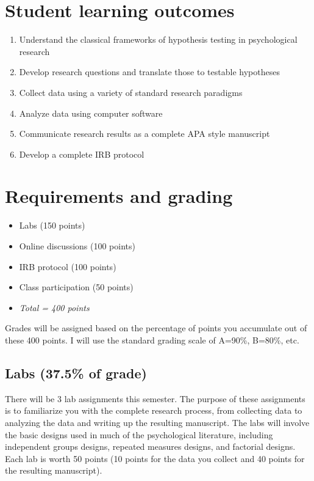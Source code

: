 \documentclass[10pt]{article}
\begin{document}
\section*{Student learning outcomes}
\label{sec-4}

\begin{enumerate}
\item Understand the classical frameworks of hypothesis testing in psychological research
\item Develop research questions and translate those to testable hypotheses
\item Collect data using a variety of standard research paradigms
\item Analyze data using computer software
\item Communicate research results as a complete APA style manuscript
\item Develop a complete IRB protocol
\end{enumerate}

\section*{Requirements and grading}
\label{sec-5}
\begin{itemize}
\item Labs (150 points)
\item Online discussions (100 points)
\item IRB protocol (100 points)
\item Class participation (50 points)
\item \emph{Total = 400 points}
\end{itemize}

Grades will be assigned based on the percentage of points you accumulate 
out of these 400 points.  I will use the standard grading scale of A=90\%, 
B=80\%, etc.

\subsection*{Labs (37.5\% of grade)}
\label{sec-5-1}
There will be 3 lab assignments this semester.  The purpose of these 
assignments is to familiarize you with the complete research process, from
collecting data to analyzing the data and writing up the resulting manuscript.
The labs will involve the basic designs used in much of the psychological
literature, including independent groups designs, repeated measures designs,
and factorial designs.  Each lab is worth 50 points (10 points for the data you
collect and 40 points for the resulting manuscript). 
\end{document}
